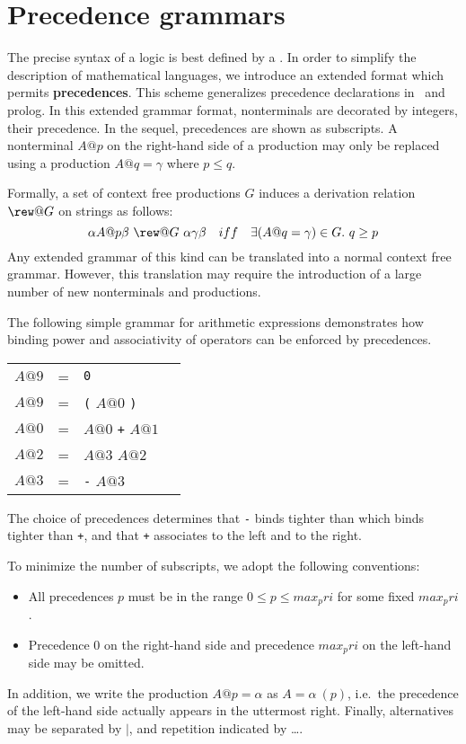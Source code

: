 \section{Precedence grammars} \label{sec:precedence_grammars}

The precise syntax of a logic is best defined by a . In order to simplify the description of mathematical languages, we
introduce an extended format which permits {\bf
precedences}. This scheme generalizes precedence
declarations in \ML\ and {\sc prolog}. In this extended grammar format,
nonterminals are decorated by integers, their precedence. In the sequel,
precedences are shown as subscripts. A nonterminal $A@p$ on the right-hand
side of a production may only be replaced using a production $A@q = \gamma$
where $p \le q$.

Formally, a set of context free productions $G$ induces a derivation
relation $\rew@G$ on strings as follows:
\[ \alpha A@p \beta ~\rew@G~ \alpha\gamma\beta ~~~iff~~~
   \exists (A@q=\gamma) \in G.~q \ge p
\]
Any extended grammar of this kind can be translated into a normal context
free grammar. However, this translation may require the introduction of a
large number of new nonterminals and productions.

\begin{example} \label{ex:precedence}
The following simple grammar for arithmetic expressions demonstrates how
binding power and associativity of operators can be enforced by precedences.
\begin{center}
\begin{tabular}{rclr}
  $A@9$ & = & {\tt0} \\
  $A@9$ & = & {\tt(} $A@0$ {\tt)} \\
  $A@0$ & = & $A@0$ {\tt+} $A@1$ \\
  $A@2$ & = & $A@3$ {\tt*} $A@2$ \\
  $A@3$ & = & {\tt-} $A@3$
\end{tabular}
\end{center}
The choice of precedences determines that {\tt -} binds tighter than {\tt *}
which binds tighter than {\tt +}, and that {\tt +} associates to the left and
{\tt *} to the right.
\end{example}

To minimize the number of subscripts, we adopt the following conventions:
\begin{itemize}
\item All precedences $p$ must be in the range $0 \leq p \leq max_pri$ for
  some fixed $max_pri$.
\item Precedence $0$ on the right-hand side and precedence $max_pri$ on the
  left-hand side may be omitted.
\end{itemize}
In addition, we write the production $A@p = \alpha$ as $A = \alpha~(p)$,
i.e.\ the precedence of the left-hand side actually appears in the uttermost
right. Finally, alternatives may be separated by $|$, and repetition
indicated by \dots.

